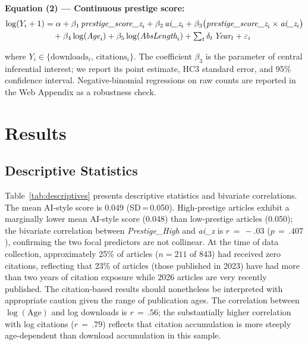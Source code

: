 \documentclass[12pt,a4paper]{article}
\begin{document}
\noindent\textbf{Equation (2) --- Continuous prestige score:}
\begin{align}
\log(Y_i+1) &= \alpha
  + \beta_1\,\textit{prestige\_score\_z}_i
  + \beta_2\,\textit{ai\_z}_i
  + \beta_3\bigl(\textit{prestige\_score\_z}_i\times\textit{ai\_z}_i\bigr)
  \notag\\
  &\quad
  + \beta_4\log(\textit{Age}_i)
  + \beta_5\log(\textit{AbsLength}_i)
  + \textstyle\sum_{t}\delta_t\,\textit{Year}_t
  + \varepsilon_i
\label{eq:score}
\end{align}

\noindent
where $Y_i\in\{\text{downloads}_i,\,\text{citations}_i\}$.
The coefficient $\beta_3$ is the parameter of central inferential
interest; we report its point estimate, HC3 standard error, and 95\%
confidence interval.
Negative-binomial regressions on raw counts are reported in the
Web Appendix as a robustness check.

\section{Results}
\label{sec:results}

\subsection{Descriptive Statistics}

Table~\ref{tab:descriptives} presents descriptive statistics and
bivariate correlations.
The mean AI-style score is 0.049 (SD\,=\,0.050).
High-prestige articles exhibit a marginally lower mean AI-style score
(0.048) than low-prestige articles (0.050); the bivariate correlation
between \textit{Prestige\_High} and \textit{ai\_z} is $r\,=\,{-}.03$
($p\,=\,.407$), confirming the two focal predictors are not collinear.
At the time of data collection, approximately 25\% of articles ($n = 211$
of 843) had received zero citations, reflecting that 23\% of articles
(those published in 2023) have had more than two years of citation
exposure while 2026 articles are very recently published.
The citation-based results should nonetheless be interpreted with
appropriate caution given the range of publication ages.
The correlation between $\log(\text{Age})$ and log downloads is
$r\,=\,.56$; the substantially higher correlation with log citations
($r\,=\,.79$) reflects that citation accumulation is more steeply
age-dependent than download accumulation in this sample.
\end{document}

